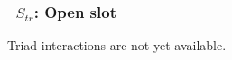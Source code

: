 \vsssub
\subsubsection{~$S_{tr}$: Open slot} \label{sec:TR0}
\vsssub


\noindent
Triad interactions are not yet available.
